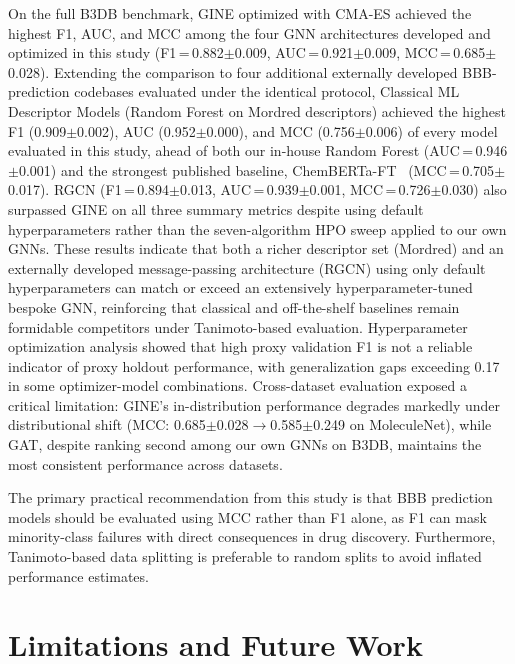 \documentclass[conference]{IEEEtran}
\begin{document}
On the full B3DB benchmark, GINE optimized with CMA-ES achieved the
highest F1, AUC, and MCC among the four GNN architectures developed
and optimized in this study (F1\,=\,0.882$\pm$0.009, AUC\,=\,0.921$\pm$0.009,
MCC\,=\,0.685$\pm$0.028). Extending the comparison to four additional externally
developed BBB-prediction codebases evaluated under the identical
protocol, Classical ML Descriptor Models (Random Forest on Mordred descriptors) achieved
the highest F1 (0.909$\pm$0.002), AUC (0.952$\pm$0.000), and MCC (0.756$\pm$0.006) of every model
evaluated in this study, ahead of both our in-house Random Forest
(AUC\,=\,0.946$\pm$0.001) and the strongest published baseline,
ChemBERTa-FT~\cite{Ahmad2022chemberta2} (MCC\,=\,0.705$\pm$0.017). RGCN
(F1\,=\,0.894$\pm$0.013, AUC\,=\,0.939$\pm$0.001, MCC\,=\,0.726$\pm$0.030) also surpassed GINE on all
three summary metrics despite using default hyperparameters rather
than the seven-algorithm HPO sweep applied to our own GNNs. These
results indicate that both a richer descriptor set (Mordred) and an
externally developed message-passing architecture (RGCN) using only
default hyperparameters can match or exceed an extensively
hyperparameter-tuned bespoke GNN, reinforcing that classical and
off-the-shelf baselines remain formidable competitors under
Tanimoto-based evaluation. Hyperparameter
optimization analysis showed that high proxy validation F1 is not a
reliable indicator of proxy holdout performance, with generalization
gaps exceeding 0.17 in some optimizer-model combinations. Cross-dataset evaluation exposed a
critical limitation: GINE's in-distribution performance degrades
markedly under distributional shift (MCC: 0.685$\pm$0.028$\to$0.585$\pm$0.249 on
MoleculeNet), while GAT, despite ranking second among our own GNNs on
B3DB, maintains the most consistent performance across datasets.

The primary practical recommendation from this study is that BBB prediction models should be evaluated using MCC rather than F1 alone, as F1 can mask minority-class failures with direct consequences in drug discovery. Furthermore, Tanimoto-based data splitting is preferable to random splits to avoid inflated performance estimates.

\section{Limitations and Future Work}
\end{document}
